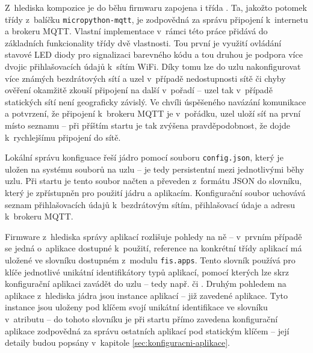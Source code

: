 Z~hlediska kompozice je do běhu firmwaru zapojena i třída . Ta, jakožto potomek třídy 
z~balíčku \texttt{micropython-mqtt}, je zodpovědná za správu připojení k~internetu a brokeru MQTT.
Vlastní implementace v~rámci této práce přidává do základních funkcionality třídy dvě vlastnosti.
Tou první je využití ovládání stavové LED diody pro signalizaci barevného kódu a tou druhou je podpora více dvojic
přihlašovacích údajů k~sítím WiFi. Díky tomu lze do uzlu nakonfigurovat více známých bezdrátových sítí a uzel
v~případě nedostupnosti sítě či chyby ověření okamžitě zkouší připojení na další v~pořadí -- uzel tak v~případě
statických sítí není geograficky závislý. Ve chvíli úspěšeného navázání komunikace a potvrzení, že připojení
k~brokeru MQTT je v~pořádku, uzel uloží síť na první místo seznamu -- při příštím startu je tak
zvýšena pravděpodobnost, že dojde k~rychlejšímu připojení do sítě.

Lokální správu konfiguace řeší jádro pomocí souboru \texttt{config.json}, který je uložen na
systému souborů na uzlu -- je tedy persistentní mezi jednotlivými běhy uzlu.
Při startu je tento soubor načten a převeden z~formátu JSON do slovníku, který je
zpřístupněn pro použití jádru a aplikacím. Konfigurační soubor uchovává seznam přihlašovacích údajů
k~bezdrátovým sítím, přihlašovací údaje a adresu k~brokeru MQTT.

Firmware z~hlediska správy aplikací rozlišuje pohledy na ně -- v~prvním případě se jedná o~aplikace dostupné
k~použití, reference na konkrétní třídy aplikací má uložené ve slovníku  dostupném z~modulu \texttt{fis.apps}.
Tento slovník používá pro klíče jednotlivé unikátní identifikátory typů aplikací, pomocí kterých lze skrz konfigurační
aplikaci zavádět do uzlu -- tedy např.  či .
Druhým pohledem na aplikace z~hlediska jádra jsou instance aplikací -- již zavedené aplikace. Tyto instance jsou
uloženy pod klíčem svojí unikátní identifikace ve slovníku v~atributu  -- do tohoto slovníku je při
startu přímo zavedena konfigurační aplikace zodpovědná za správu ostatních aplikací pod statickým klíčem 
-- její detaily budou popsány v~kapitole \ref{sec:konfiguracni-aplikace}.

